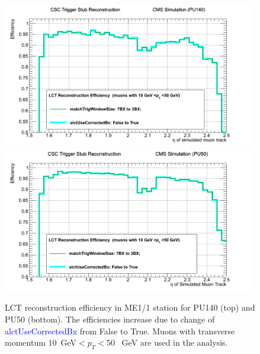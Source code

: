 \begin{figure} [h!]
\includegraphics[width=0.98\textwidth]{figures/PU140_Improv_from3_to_4.png}
\includegraphics[width=0.98\textwidth]{figures/PU50_Improv_from3_to_4.png}
\caption{LCT reconstruction efficiency in ME1/1 station for PU140 (top) and PU50 (bottom). The efficiencies increase due to change of \textcolor{blue}{alctUseCorrectedBx} from False to True. Muons with transverse momentum $10$~GeV$<p_T<50$~ GeV are used in the analysis.}
\label{fig:From3to4}
\end{figure}
